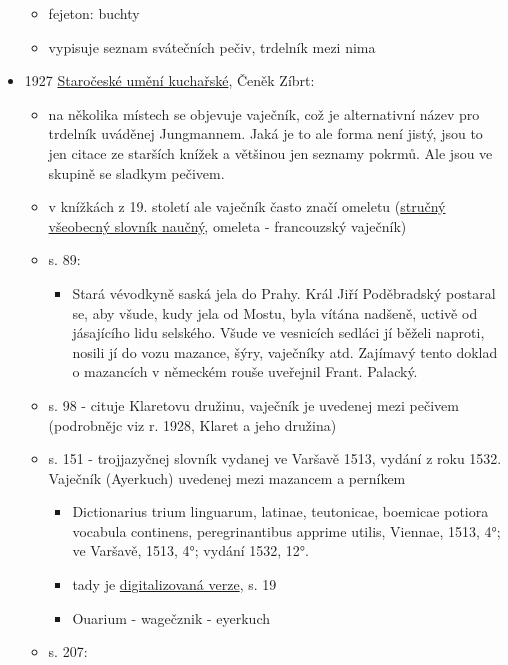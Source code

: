 \begin{itemize}
  \begin{itemize}
  \tightlist
  \item
    fejeton: buchty
  \item
    vypisuje seznam svátečních pečiv, trdelník mezi nima
  \end{itemize}
\item
  1927
  \href{https://ndk.cz/uuid/uuid:b59a1ff0-9f23-11ea-b6e0-005056827e51}{Staročeské
  umění kuchařské}, Čeněk Zíbrt:

  \begin{itemize}
  \tightlist
  \item
    na několika místech se objevuje vaječník, což je alternativní název
    pro trdelník uváděnej Jungmannem. Jaká je to ale forma není jistý,
    jsou to jen citace ze starších knížek a většinou jen seznamy pokrmů.
    Ale jsou ve skupině se sladkym pečivem.
  \item
    v knížkách z 19. století ale vaječník často značí omeletu
    (\href{https://ndk.cz/uuid/uuid:f7e03900-d300-11dc-9815-000d606f5dc6}{stručný
    všeobecný slovník naučný}, omeleta - francouzský vaječník)
  \item
    s. 89:

    \begin{itemize}
    \tightlist
    \item
      Stará vévodkyně saská jela do Prahy. Král Jiří Poděbradský
      postaral se, aby všude, kudy jela od Mostu, byla vítána nadšeně,
      uctivě od jásajícího lidu selského. Všude ve vesnicích sedláci jí
      běželi naproti, nosili jí do vozu mazance, šýry, vaječníky atd.
      Zajímavý tento doklad o mazancích v německém rouše uveřejnil
      Frant. Palacký.
    \end{itemize}
  \item
    s. 98 - cituje Klaretovu družinu, vaječník je uvedenej mezi pečivem
    (podrobnějc viz r. 1928, Klaret a jeho družina)
  \item
    s. 151 - trojjazyčnej slovník vydanej ve Varšavě 1513, vydání z roku
    1532. Vaječník (Ayerkuch) uvedenej mezi mazancem a perníkem

    \begin{itemize}
    \tightlist
    \item
      Dictionarius trium linguarum, latinae, teutonicae, boemicae
      potiora vocabula continens, peregrinantibus apprime utilis,
      Viennae, 1513, 4°; ve Varšavě, 1513, 4°; vydání 1532, 12°.
    \item
      tady je
      \href{https://dbc.wroc.pl/dlibra/publication/33643/edition/30385/content?ref=L3B1YmxpY2F0aW9uLzM0Njg5L2VkaXRpb24vMzE0MTQ}{digitalizovaná
      verze}, s. 19
    \item
      Ouarium - wagečznik - eyerkuch
    \end{itemize}
  \item
    s. 207:


\end{itemize}
\end{itemize}
